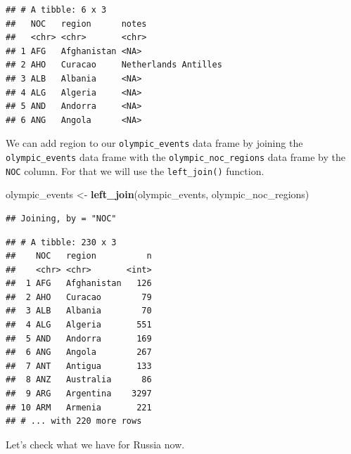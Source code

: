 \documentclass[
]{book}
\newenvironment{Shaded}{\begin{snugshade}}{\end{snugshade}}
\newcommand{\KeywordTok}[1]{\textcolor[rgb]{0.13,0.29,0.53}{\textbf{#1}}}
\newcommand{\NormalTok}[1]{#1}
\newcommand{\OperatorTok}[1]{\textcolor[rgb]{0.81,0.36,0.00}{\textbf{#1}}}
\newcommand{\StringTok}[1]{\textcolor[rgb]{0.31,0.60,0.02}{#1}}
\begin{document}
\begin{verbatim}
## # A tibble: 6 x 3
##   NOC   region      notes               
##   <chr> <chr>       <chr>               
## 1 AFG   Afghanistan <NA>                
## 2 AHO   Curacao     Netherlands Antilles
## 3 ALB   Albania     <NA>                
## 4 ALG   Algeria     <NA>                
## 5 AND   Andorra     <NA>                
## 6 ANG   Angola      <NA>
\end{verbatim}

We can add region to our \texttt{olympic\_events} data frame by joining the \texttt{olympic\_events} data frame with the \texttt{olympic\_noc\_regions} data frame by the \texttt{NOC} column. For that we will use the \texttt{left\_join()} function.

\begin{Shaded}
\begin{Highlighting}[]
\NormalTok{olympic_events <-}\StringTok{ }\KeywordTok{left_join}\NormalTok{(olympic_events,}
\NormalTok{                       olympic_noc_regions)}
\end{Highlighting}
\end{Shaded}

\begin{verbatim}
## Joining, by = "NOC"
\end{verbatim}

\begin{Shaded}
\end{Shaded}

\begin{verbatim}
## # A tibble: 230 x 3
##    NOC   region          n
##    <chr> <chr>       <int>
##  1 AFG   Afghanistan   126
##  2 AHO   Curacao        79
##  3 ALB   Albania        70
##  4 ALG   Algeria       551
##  5 AND   Andorra       169
##  6 ANG   Angola        267
##  7 ANT   Antigua       133
##  8 ANZ   Australia      86
##  9 ARG   Argentina    3297
## 10 ARM   Armenia       221
## # ... with 220 more rows
\end{verbatim}

Let's check what we have for Russia now.

\begin{Shaded}
\end{Shaded}
\end{document}
